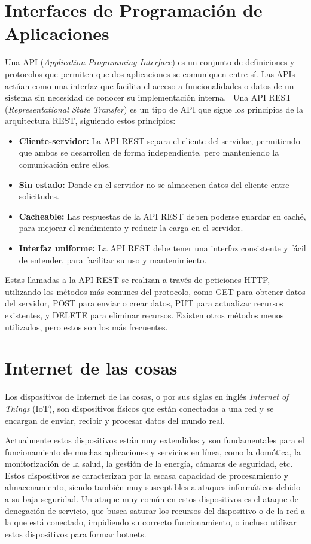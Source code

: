 \section{Interfaces de Programación de Aplicaciones}
Una API (\textit{Application Programming Interface}) es un conjunto de definiciones y protocolos que permiten que dos aplicaciones se comuniquen entre sí. Las APIs actúan como una interfaz que facilita el acceso a funcionalidades o datos de un sistema sin necesidad de conocer su implementación interna.~\cite{Api}
Una API REST (\textit{Representational State Transfer}) es un tipo de API que sigue los principios de la arquitectura REST, siguiendo estos principios:
\begin{itemize}
	\item \textbf{Cliente-servidor:} La API REST separa el cliente del servidor, permitiendo que ambos se desarrollen de forma independiente, pero manteniendo la comunicación entre ellos.
	\item \textbf{Sin estado:} Donde en el servidor no se almacenen datos del cliente entre solicitudes.
	\item \textbf{Cacheable:} Las respuestas de la API REST deben poderse guardar en caché, para mejorar el rendimiento y reducir la carga en el servidor.
	\item \textbf{Interfaz uniforme:} La API REST debe tener una interfaz consistente y fácil de entender, para facilitar su uso y mantenimiento.
\end{itemize}
Estas llamadas a la API REST se realizan a través de peticiones HTTP, utilizando los métodos más comunes del protocolo, como GET para obtener datos del servidor, POST para enviar o crear datos, PUT para actualizar recursos existentes, y DELETE para eliminar recursos. Existen otros métodos menos utilizados, pero estos son los más frecuentes.

\section{Internet de las cosas}
Los dispositivos de Internet de las cosas, o por sus siglas en inglés \textit{Internet of Things} (IoT), son dispositivos físicos que están conectados a una red y se encargan de enviar, recibir y procesar datos del mundo real. ~\cite{AzizAlKabir2023} 

Actualmente estos dispositivos están muy extendidos y son fundamentales para el funcionamiento de muchas aplicaciones y servicios en línea, como la domótica, la monitorización de la salud, la gestión de la energía, cámaras de seguridad, etc. Estos dispositivos se caracterizan por la escasa capacidad de procesamiento y almacenamiento, siendo también muy susceptibles a ataques informáticos debido a su baja seguridad. Un ataque muy común en estos dispositivos es el ataque de denegación de servicio, que busca saturar los recursos del dispositivo o de la red a la que está conectado, impidiendo su correcto funcionamiento, o incluso utilizar estos dispositivos para formar botnets. ~\cite{kolias2017}



